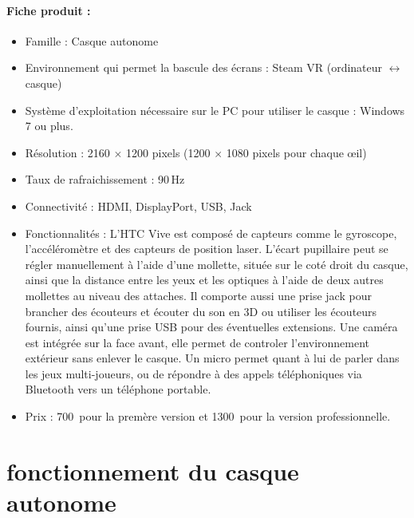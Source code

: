 \documentclass[12pt, a4paper]{report}
\newcommand{\euro}{\,\EUR}
\begin{document}
\paragraph{Fiche produit :}
\begin{itemize}
\item Famille : Casque autonome
\item Environnement qui permet la bascule des écrans : Steam VR (ordinateur $\leftrightarrow$ casque)
\item Système d'exploitation nécessaire sur le PC pour utiliser le casque : Windows 7 ou plus.
\item Résolution : 2160 $\times$ 1200 pixels (1200 $\times$ 1080 pixels pour chaque \oe{}il)
\item Taux de rafraichissement : 90\,Hz
\item Connectivité : HDMI, DisplayPort, USB, Jack
\item Fonctionnalités : L'HTC Vive est composé de capteurs comme le gyroscope, l'accéléromètre et des capteurs de position laser.
L'écart pupillaire peut se régler manuellement à l'aide d'une mollette, située sur le coté droit du casque, ainsi que la distance entre les yeux et les optiques à l'aide de deux autres mollettes au niveau des attaches.
 Il comporte aussi une prise jack pour brancher des écouteurs et écouter du son en 3D ou utiliser les écouteurs fournis, ainsi qu'une prise USB pour des éventuelles extensions. Une caméra est intégrée sur la face avant, elle permet de controler l'environnement extérieur sans enlever le casque. Un micro permet quant à lui de parler dans les jeux multi-joueurs, ou de répondre à des appels téléphoniques via  Bluetooth vers un téléphone portable.
\item Prix : 700\euro{} pour la premère version et 1300\euro{} pour la version professionnelle.
\end{itemize}

\section[Fontionnement de l'HTC Vive]{fonctionnement du casque autonome}
\end{document}
